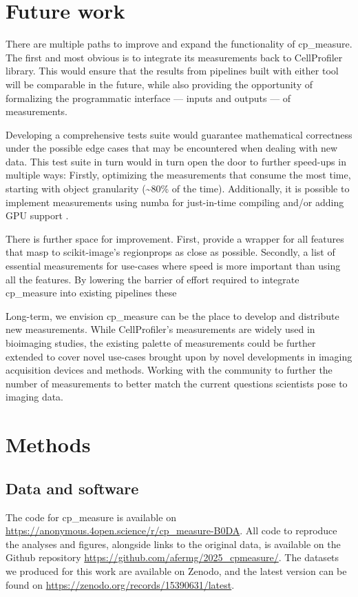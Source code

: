 \documentclass{article}
\begin{document}
\section{Future work}
\label{sec:orgd895d97}
There are multiple paths to improve and expand the functionality of cp\_measure. The first and most obvious is to integrate its measurements back to CellProfiler library. This would ensure that the results from pipelines built with either tool will be comparable in the future, while also providing the opportunity of formalizing the programmatic interface --- inputs and outputs --- of measurements.

Developing a comprehensive tests suite would guarantee mathematical correctness under the possible edge cases that may be encountered when dealing with new data. This test suite in turn would in turn open the door to further speed-ups in multiple ways: Firstly, optimizing the measurements that consume the most time, starting with object granularity (\textasciitilde{}80\% of the time). Additionally, it is possible to implement measurements using numba for just-in-time compiling and/or adding GPU support \citep{lamNumbaLLVMbasedPython2015}.

There is further space for improvement. First, provide a wrapper for all features that masp to scikit-image's regionprops as close as possible. Secondly, a list of essential measurements for use-cases where speed is more important than using all the features. By lowering the barrier of effort required to integrate cp\_measure into existing pipelines these 

Long-term, we envision cp\_measure can be the place to develop and distribute new measurements. While CellProfiler's measurements are widely used in bioimaging studies, the existing palette of measurements could be further extended to cover novel use-cases brought upon by novel developments in imaging acquisition devices and methods. Working with the community to further the number of measurements to better match the current questions scientists pose to imaging data.
\section{Methods}
\label{sec:orgf3a6049}
\subsection{Data and software}
\label{sec:orgba4bd5c}
The code for cp\_measure is available on \url{https://anonymous.4open.science/r/cp\_measure-B0DA}. All code to reproduce the analyses and figures, alongside links to the original data, is available on the Github repository \url{https://github.com/afermg/2025\_cpmeasure/}. The datasets we produced for this work are available on Zenodo, and the latest version can be found on \url{https://zenodo.org/records/15390631/latest}.



\end{document}
